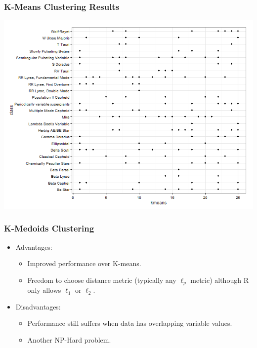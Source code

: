 \documentclass{beamer}
\begin{document}

\begin{frame}
\frametitle{K-Means Clustering Results}
\begin{center}
\includegraphics[scale=.4]{kmeans.png}
\end{center}
\end{frame}


\begin{frame}
\frametitle{K-Medoids Clustering}
\begin{itemize}
\item Advantages: 
\begin{itemize}
\item Improved performance over K-means.
\item Freedom to choose distance metric (typically any $\ell_p$ metric) although R only allows $\ell_1$ or $\ell _2$.
\end{itemize}
\item Disadvantages: 
\begin{itemize}
\item Performance still suffers when data has overlapping variable values.
\item Another NP-Hard problem.
\end{itemize}
\end{itemize}
\end{frame}
\end{document}
